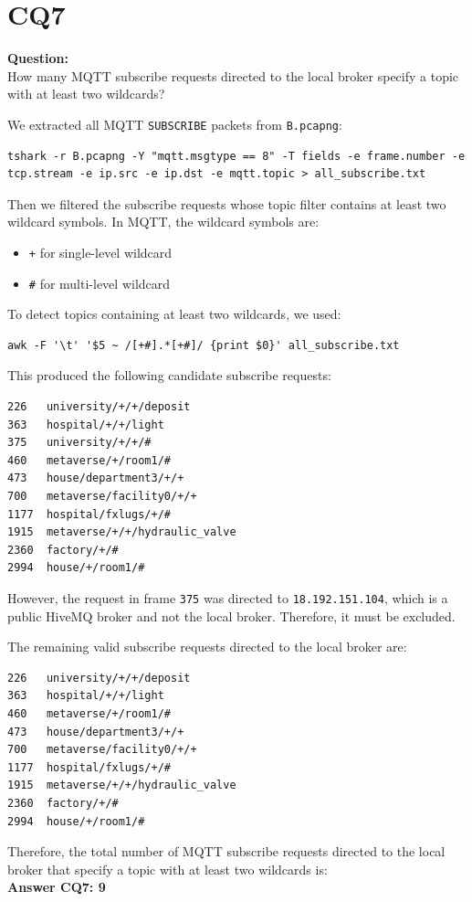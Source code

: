 \section{CQ7}

\begin{fancyquote}
    \textbf{Question:}\\
    How many MQTT subscribe requests directed to the local broker specify a topic with at least two wildcards?
\end{fancyquote}

We extracted all MQTT \texttt{SUBSCRIBE} packets from \texttt{B.pcapng}:

\begin{lstlisting}
tshark -r B.pcapng -Y "mqtt.msgtype == 8" -T fields -e frame.number -e tcp.stream -e ip.src -e ip.dst -e mqtt.topic > all_subscribe.txt
\end{lstlisting}

Then we filtered the subscribe requests whose topic filter contains at least two wildcard symbols.  
In MQTT, the wildcard symbols are:
\begin{itemize}
    \item \texttt{+} for single-level wildcard
    \item \texttt{\#} for multi-level wildcard
\end{itemize}

To detect topics containing at least two wildcards, we used:

\begin{lstlisting}
awk -F '\t' '$5 ~ /[+#].*[+#]/ {print $0}' all_subscribe.txt
\end{lstlisting}

This produced the following candidate subscribe requests:

\begin{verbatim}
226   university/+/+/deposit
363   hospital/+/+/light
375   university/+/+/#
460   metaverse/+/room1/#
473   house/department3/+/+
700   metaverse/facility0/+/+
1177  hospital/fxlugs/+/#
1915  metaverse/+/+/hydraulic_valve
2360  factory/+/#
2994  house/+/room1/#
\end{verbatim}

However, the request in frame \texttt{375} was directed to \texttt{18.192.151.104}, which is a public HiveMQ broker and not the local broker. Therefore, it must be excluded.

The remaining valid subscribe requests directed to the local broker are:

\begin{verbatim}
226   university/+/+/deposit
363   hospital/+/+/light
460   metaverse/+/room1/#
473   house/department3/+/+
700   metaverse/facility0/+/+
1177  hospital/fxlugs/+/#
1915  metaverse/+/+/hydraulic_valve
2360  factory/+/#
2994  house/+/room1/#
\end{verbatim}

Therefore, the total number of MQTT subscribe requests directed to the local broker that specify a topic with at least two wildcards is:\\

\textbf{\huge Answer CQ7: 9}